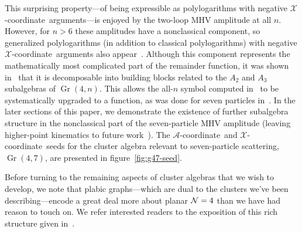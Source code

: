 \documentclass[12pt]{article}
\DeclareMathOperator{\Gr}{Gr}
\def\xcoord{$\mathcal{X}$-coordinate}
\def\acoord{$\mathcal{A}$-coordinate}
\begin{document}
This surprising property---of being expressible as polylogarithms with negative \xcoord\ arguments---is enjoyed by the two-loop MHV amplitude at all $n$. However, for $n>6$ these amplitudes have a nonclassical component, so generalized polylogarithms (in addition to classical polylogarithms) with negative \xcoord\ arguments also appear~\cite{Golden:2013xva}. Although this component represents the mathematically most complicated part of the remainder function, it was shown in~\cite{Golden:2014xqa} that it is decomposable into building blocks related to the $A_2$ and $A_3$ subalgebras of $\Gr(4,n)$. This allows the all-$n$ symbol computed in~\cite{CaronHuot:2011ky} to be systematically upgraded to a function, as was done for seven particles in~\cite{Golden:2014xqf}. In the later sections of this paper, we demonstrate the existence of further subalgebra structure in the nonclassical part of the seven-particle MHV amplitude (leaving higher-point kinematics to future work~\cite{cluster_subalgebras_ii}). The \acoord\ and \xcoord\ seeds for the cluster algebra relevant to seven-particle scattering, $\Gr(4,7)$, are presented in figure~\ref{fig:g47-seed}.

Before turning to the remaining aspects of cluster algebras that we wish to develop, we note that plabic graphs---which are dual to the clusters we've been describing---encode a great deal more about planar ${\cal N}=4$ than we have had reason to touch on. We refer interested readers to the exposition of this rich structure given in~\cite{ArkaniHamed:2012nw}.
\end{document}
